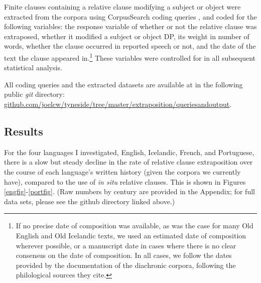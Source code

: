 Finite clauses containing a relative clause modifying a subject or object were extracted from the corpora using CorpusSearch coding queries \citep{corpussearch}, and coded for the following variables: the response variable of whether or not the relative clause was extraposed, whether it modified a subject or object DP, its weight in number of words, whether the clause occurred in reported speech or not, and the date of the text the clause appeared in.\footnote{If no precise date of composition was available, as was the case for many Old English and Old Icelandic texts, we used an estimated date of composition wherever possible, or a manuscript date in cases where there is no clear consensus on the date of composition. In all cases, we follow the dates provided by the documentation of the diachronic corpora, following the philological sources they cite.} These variables were controlled for in all subsequent statistical analysis.


All coding queries and the extracted datasets are available at in the following public \textsl{git} directory: \url{github.com/joelcw/tyneside/tree/master/extraposition/queriesandoutput}.






\subsection{Results}
\label{results}

For the four languages I investigated, English, Icelandic, French, and Portuguese, there is a slow but steady decline in the rate of relative clause extraposition over the course of each language's written history (given the corpora we currently have), compared to the use of \textsl{in situ} relative clauses. This is shown in Figures \ref{engfig}-\ref{portfig}. (Raw numbers by century are provided in the Appendix; for full data sets, please see the github directory linked above.) 

